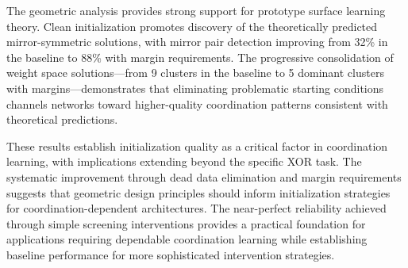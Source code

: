The geometric analysis provides strong support for prototype surface learning theory. Clean initialization promotes discovery of the theoretically predicted mirror-symmetric solutions, with mirror pair detection improving from 32\% in the baseline to 88\% with margin requirements. The progressive consolidation of weight space solutions—from 9 clusters in the baseline to 5 dominant clusters with margins—demonstrates that eliminating problematic starting conditions channels networks toward higher-quality coordination patterns consistent with theoretical predictions.

These results establish initialization quality as a critical factor in coordination learning, with implications extending beyond the specific XOR task. The systematic improvement through dead data elimination and margin requirements suggests that geometric design principles should inform initialization strategies for coordination-dependent architectures. The near-perfect reliability achieved through simple screening interventions provides a practical foundation for applications requiring dependable coordination learning while establishing baseline performance for more sophisticated intervention strategies.


